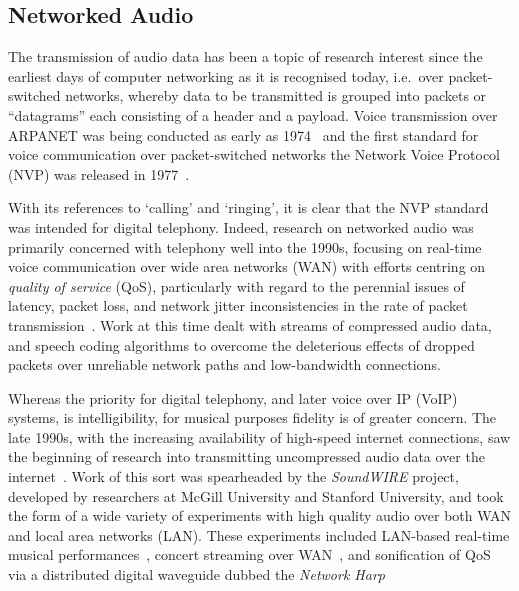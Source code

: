 \subsection{Networked Audio}\label{subsec:networked-audio}

The transmission of audio data has been a topic of research interest since the
earliest days of computer networking as it is recognised today, i.e.\ over
packet-switched networks, whereby data to be transmitted is grouped into
packets \textemdash{} or ``datagrams'' \textemdash{} each consisting of a header
and a payload.
Voice transmission over ARPANET was being conducted as early as
1974~\citep{schulzrinne_voice_1992} and the first standard for voice
communication over packet-switched networks \textemdash{} the Network Voice
Protocol (NVP) \textemdash{} was released in
1977~\citep{cohen_specifications_1977}.

With its references to `calling' and `ringing', it is clear that the NVP
standard was intended for digital telephony.
Indeed, research on networked audio was primarily concerned with telephony well
into the 1990s, focusing on real-time voice communication over wide area
networks (WAN) with efforts centring on \textit{quality of service} (QoS),
particularly with regard to the perennial issues of latency, packet loss, and
network jitter \textemdash{} inconsistencies in the rate of packet
transmission~\citep{hardman_reliable_1995,hardman_successful_1998}.
Work at this time dealt with streams of compressed audio data, and speech
coding algorithms to overcome the deleterious effects of dropped packets over
unreliable network paths and low-bandwidth connections.

Whereas the priority for digital telephony, and later voice over IP (VoIP)
systems, is intelligibility, for musical purposes fidelity is of greater 
concern.
The late 1990s, with the increasing availability of high-speed internet 
connections, saw the beginning of research into transmitting uncompressed audio 
data over the internet~\citep{chafe_simplified_2000,xu_real-time_2000}.
Work of this sort was spearheaded by the \textit{SoundWIRE} project, developed
by researchers at McGill University and Stanford University, and took the form
of a wide variety of experiments with high quality audio over both WAN and local
area networks (LAN).
These experiments included LAN-based real-time musical
performances~\citep{chafe_simplified_2000}, concert streaming over
WAN~\citep{xu_real-time_2000,chafe_simplified_2000}, and sonification of QoS via
a distributed digital waveguide dubbed the
\textit{Network Harp}~\citep{chafe_simplified_2000,chafe_physical_2002}


